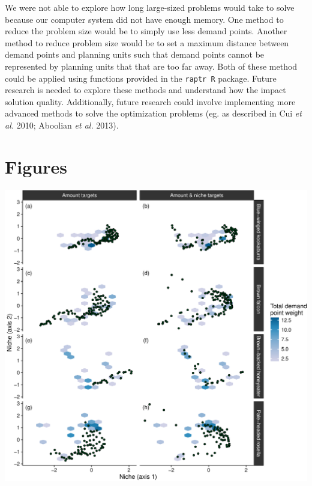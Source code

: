 \documentclass[11pt,]{article}
\let\origfigure\figure
\let\endorigfigure\endfigure
\renewenvironment{figure}[1][2] {
	\expandafter\origfigure\expandafter[H]
} {
	\endorigfigure
}
\begin{document}
We were not able to explore how long large-sized problems would take to
solve because our computer system did not have enough memory. One method
to reduce the problem size would be to simply use less demand points.
Another method to reduce problem size would be to set a maximum distance
between demand points and planning units such that demand points cannot
be represented by planning units that that are too far away. Both of
these method could be applied using functions provided in the
\texttt{raptr R} package. Future research is needed to explore these
methods and understand how the impact solution quality. Additionally,
future research could involve implementing more advanced methods to
solve the optimization problems (eg. as described in Cui \emph{et al.}
2010; Aboolian \emph{et al.} 2013).

\clearpage

\section{Figures}\label{figures}

\begin{figure}
\centering
\includegraphics{supporting-information_files/figure-latex/unnamed-chunk-3-1.pdf}
\caption{Attribute spaces used in the first case-study. Each panel shows
a the distribution of a solution in environmental space and how it
samples the realized niche for a different species. The left column of
panels shows the solution generated using amount targets. The right
column of panels shows the solution generated using amount and niche
targets. Each column of panels corresponds to a different species.
Hexagons show the distribution of demand points. The color of each
hexagon denotes the weighted frequency of demand points inside it.
Points represent the environmental conditions associated with planning
units inside the species geographic range that were selected for
preservation in a given solution.}
\end{figure}
\end{document}
